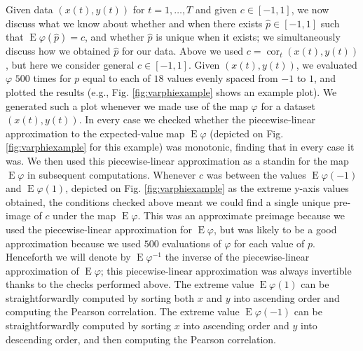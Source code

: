 \documentclass[letterpaper,11pt]{article}
\newcommand{\E}{\operatorname{E}}
\newcommand{\cor}{\operatorname{cor}}
\begin{document}
Given data $(x(t),y(t))$ for $t=1,\ldots,T$ and given $c \in [-1,1]$,
we now discuss what we know about whether and when there exists $\hat{p} \in [-1,1]$ such 
that $\E\varphi(\hat{p})=c$, and whether $\hat{p}$ is unique when it 
exists; we simultaneously discuss how we obtained $\hat{p}$ for our data.
Above we used $c=\cor_t(x(t),y(t))$, but here we consider general $c \in [-1,1]$. 
Given $(x(t),y(t))$, we evaluated $\varphi$ $500$ times for $p$ equal to each
of $18$ values evenly spaced from $-1$ to $1$, and plotted the results (e.g., Fig. 
\ref{fig:varphiexample} shows an example plot). We generated such a plot
whenever we made use of the map $\varphi$ for a dataset $(x(t),y(t))$.
In every case we checked whether the piecewise-linear approximation 
to the expected-value map $\E\varphi$ (depicted on Fig. \ref{fig:varphiexample} 
for this example) was monotonic, finding that in every case it was. We then
used this piecewise-linear approximation as a standin for the map
$\E\varphi$ in subsequent computations. Whenever $c$ was between the values
$\E\varphi(-1)$ and $\E\varphi(1)$, depicted on Fig. \ref{fig:varphiexample}
as the extreme y-axis values obtained, the conditions checked above meant we could
find a single unique pre-image of $c$ under the map $\E\varphi$. This was 
an approximate preimage because we used the piecewise-linear approximation for 
$\E\varphi$, but was likely to be a good approximation because we used $500$
evaluations of $\varphi$ for each value of $p$.
Henceforth we will denote by $\E\varphi^{-1}$ the inverse of the piecewise-linear
approximation of $\E\varphi$; this piecewise-linear approximation was always invertible
thanks to the checks performed above. The extreme value 
$\E\varphi(1)$ can be straightforwardly
computed by sorting both $x$ and $y$ into ascending order and computing the Pearson correlation.
The extreme value $\E\varphi(-1)$ can be straightforwardly
computed by sorting $x$ into ascending order and $y$ into descending order, and
then computing the Pearson correlation.
\end{document}
